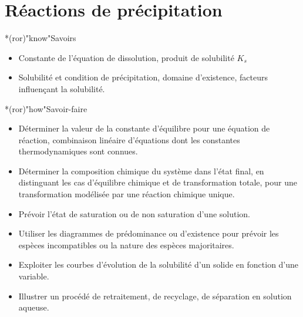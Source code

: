 \documentclass[../../main/main.tex]{subfiles}
\begin{document}
\setcounter{chapter}{3}


\chapter{R\'eactions de précipitation}

\vspace*{\fill}

\begin{prgm}
	\begin{tcb}*(ror)"know"{Savoirs}
		\begin{itemize}
			\item Constante de l'équation de dissolution, produit de solubilité $K_s$
			\item Solubilité et condition de précipitation, domaine d'existence,
			      facteurs influençant la solubilité.
		\end{itemize}
	\end{tcb}
	\begin{tcb}*(ror)"how"{Savoir-faire}
		\begin{itemize}
			\item Déterminer la valeur de la constante d'équilibre pour une équation
			      de réaction, combinaison linéaire d'équations dont les constantes
			      thermodynamiques sont connues.
			\item Déterminer la composition chimique du système dans l'état final, en
			      distinguant les cas d'équilibre chimique et de transformation totale,
			      pour une transformation modélisée par une réaction chimique unique.
			\item Prévoir l'état de saturation ou de non saturation d'une solution.
			\item Utiliser les diagrammes de prédominance ou d'existence pour prévoir
			      les espèces incompatibles ou la nature des espèces majoritaires.
			\item Exploiter les courbes d'évolution de la solubilité d'un solide en
			      fonction d'une variable.
			\item Illustrer un procédé de retraitement, de recyclage, de séparation
			      en solution aqueuse.
		\end{itemize}
	\end{tcb}
\end{prgm}

\vspace*{\fill}
\minitoc
\vspace*{\fill}
\end{document}
